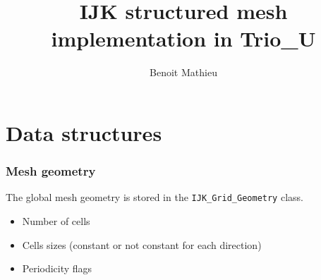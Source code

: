 \documentclass[10pt]{beamer}
\begin{document}
\title{IJK structured mesh implementation in Trio\_U}
\author{Benoit Mathieu}
\begin{frame}
  \titlepage
\tableofcontents
\end{frame}
\section{Data structures}
\begin{frame}[fragile]
\frametitle{Mesh geometry}
 The global mesh geometry is stored in the \verb|IJK_Grid_Geometry| class.
\begin{itemize}
\item Number of cells
\item Cells sizes (constant or not constant for each direction)
\item Periodicity flags
\end{itemize}

\end{frame}
\end{document}
